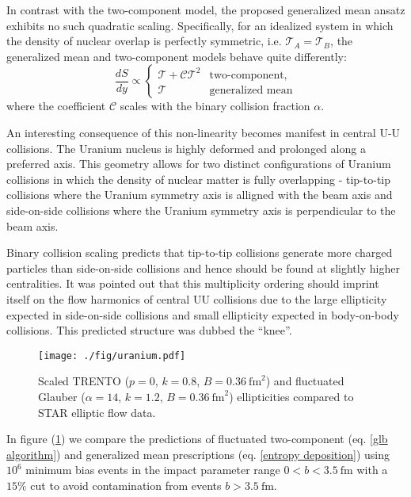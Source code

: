\documentclass[aps,prl,reprint,amsmath,nofootinbib]{revtex4-1}
\begin{document}
In contrast with the two-component model, the proposed generalized mean ansatz exhibits no such quadratic scaling. Specifically, for an idealized system in which the density of nuclear overlap is perfectly symmetric, 
i.e. $\mathcal{T}_A = \mathcal{T}_B$, the generalized mean and two-component models behave quite differently:
\begin{equation}
   \label{symmetric scaling}
   \frac{dS}{dy} \propto
  \begin{cases}
   \mathcal{T} + \mathcal{C} \mathcal{T}^2 & \text{two-component,}\\
   \mathcal{T} & \text{generalized mean}
  \end{cases}
\end{equation}
where the coefficient $\mathcal{C}$ scales with the binary collision fraction $\alpha$.

An interesting consequence of this non-linearity becomes manifest in central U-U collisions. The Uranium nucleus is highly deformed and prolonged along a preferred
axis. This geometry allows for two distinct configurations of Uranium collisions in which the density of nuclear matter is fully overlapping - tip-to-tip collisions
where the Uranium symmetry axis is alligned with the beam axis and side-on-side collisions where the Uranium symmetry axis is perpendicular to the beam axis.

Binary collision scaling predicts that tip-to-tip collisions generate more charged particles than side-on-side collisions and hence should be found at slightly
higher centralities. It was pointed out that this multiplicity ordering should imprint itself on the flow harmonics of central UU collisions due to the large 
ellipticity expected in side-on-side collisions and small ellipticity expected in body-on-body collisions. This predicted structure was dubbed the ``knee''.

\begin{figure}[h]
 \centering
 \texttt{[image: ./fig/uranium.pdf]}
 \caption{\label{fig:knee} Scaled TRENTO ($p=0$, $k=0.8$, $B=0.36~\mathrm{fm}^2$) and fluctuated Glauber ($\alpha=14$, $k=1.2$, $B=0.36~\mathrm{fm}^2$) ellipticities
 compared to STAR elliptic flow data.}
\end{figure}

In figure (\ref{fig:knee}) we compare the predictions of fluctuated two-component (eq. \ref{glb algorithm}) and generalized mean prescriptions
(eq. \ref{entropy deposition}) using $10^6$ minimum bias events in the impact parameter range $0<b<3.5 ~\mathrm{fm}$ with a $15\%$ cut to avoid 
contamination from events $b>3.5 ~\mathrm{fm}$.
\end{document}
